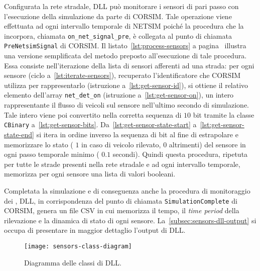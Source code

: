Configurata la rete stradale,  \acs{DLL} può monitorare i sensori di pari passo con l'esecuzione della simulazione da parte di \acs{CORSIM}. Tale operazione viene effettuata ad ogni intervallo temporale di \acs{NETSIM} poiché la procedura che la incorpora, chiamata \lstinline[]|on_net_signal_pre|, è collegata al punto di chiamata \lstinline[]|PreNetsimSignal| di \acs{CORSIM}. Il listato~\ref{lst:process-sensors} a pagina~\pageref{lst:process-sensors} illustra una versione semplificata del metodo \CC{} preposto all'esecuzione di tale procedura. Essa consiste nell'iterazione della lista di sensori afferenti ad una strada: per ogni sensore (ciclo a~\autoref{lst:iterate-sensors}), recuperato l'identificatore che \acs{CORSIM} utilizza per rappresentarlo (istruzione a~\autoref{lst:get-sensor-id}), si ottiene il relativo elemento dell'array \lstinline[]|net_det_on| (istruzione a~\autoref{lst:get-sensor-on}), un intero rappresentante il flusso di veicoli sul sensore nell'ultimo secondo di simulazione. Tale intero viene poi convertito nella corretta sequenza di $10$ bit tramite la classe \lstinline[]|CBinary| a~\autoref{lst:get-sensor-bits}. Da~\autoref{lst:get-sensor-state-start} a~\autoref{lst:get-sensor-state-end} si itera in ordine inverso la sequenza di bit al fine di estrapolare e memorizzare lo stato (\ie{} $1$ in caso di veicolo rilevato, $0$ altrimenti) del sensore in ogni passo temporale minimo (\ie{} $0.1$ secondi). Quindi questa procedura, ripetuta per tutte le strade presenti nella rete stradale e ad ogni intervallo temporale, memorizza per ogni sensore una lista di valori booleani.

Completata la simulazione e di conseguenza anche la procedura di monitoraggio dei ,  \acs{DLL}, in corrispondenza del punto di chiamata \lstinline[]|SimulationComplete| di \acs{CORSIM}, genera un file \acs{CSV} in cui memorizza il tempo, il \emph{time period} della rilevazione e la dinamica di stato di ogni sensore. La~\autoref{subsec:sensors-dll-output}  si occupa di presentare in maggior dettaglio l'output di  \acs{DLL}.

\vspace*{8pt}

\begin{figure}[H]
    \centering
    \texttt{[image: sensors-class-diagram]}
    \caption[Diagramma delle classi di  \acs{DLL}]{Diagramma delle classi di  \acs{DLL}.}
    \label{fig:sensors-class-diagram}
\end{figure}

